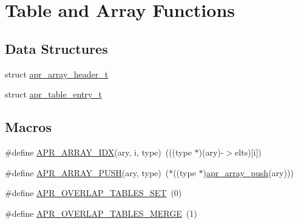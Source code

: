 \hypertarget{group__apr__tables}{}\section{Table and Array Functions}
\label{group__apr__tables}
\subsection*{Data Structures}
\begin{DoxyCompactItemize}
\item 
struct \hyperlink{structapr__array__header__t}{apr\+\_\+array\+\_\+header\+\_\+t}
\item 
struct \hyperlink{structapr__table__entry__t}{apr\+\_\+table\+\_\+entry\+\_\+t}
\end{DoxyCompactItemize}
\subsection*{Macros}
\begin{DoxyCompactItemize}
\item 
\#define \hyperlink{group__apr__tables_ga84066caaa4c7632671af18c229809fc4}{A\+P\+R\+\_\+\+A\+R\+R\+A\+Y\+\_\+\+I\+DX}(ary,  i,  type)~(((type $\ast$)(ary)-\/$>$elts)\mbox{[}i\mbox{]})
\item 
\#define \hyperlink{group__apr__tables_ga1833b0f940ec03d0b95926812152e1ca}{A\+P\+R\+\_\+\+A\+R\+R\+A\+Y\+\_\+\+P\+U\+SH}(ary,  type)~($\ast$((type $\ast$)\hyperlink{group__apr__tables_gac08267b32905197dd02ffff3314d9603}{apr\+\_\+array\+\_\+push}(ary)))
\item 
\#define \hyperlink{group__apr__tables_ga867455bb7008872e03b08c0742f9698c}{A\+P\+R\+\_\+\+O\+V\+E\+R\+L\+A\+P\+\_\+\+T\+A\+B\+L\+E\+S\+\_\+\+S\+ET}~(0)
\item 
\#define \hyperlink{group__apr__tables_ga553eea6eb6fea4bafaf4cbd7acafdf5f}{A\+P\+R\+\_\+\+O\+V\+E\+R\+L\+A\+P\+\_\+\+T\+A\+B\+L\+E\+S\+\_\+\+M\+E\+R\+GE}~(1)
\end{DoxyCompactItemize}
